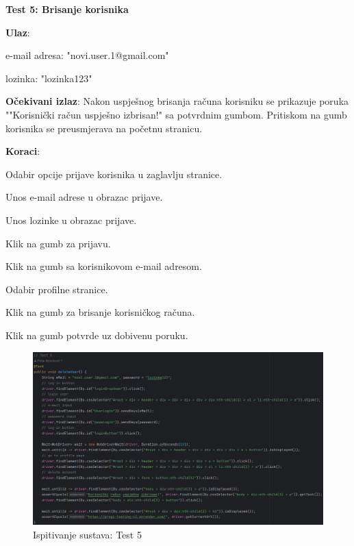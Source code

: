 		 	\textbf{Test 5: Brisanje korisnika}
		 	
		 	\begin{packed_item} 
		 		\item \textbf{Ulaz}:
		 		\begin{packed_item} 
		 			\item e-mail adresa: "novi.user.1@gmail.com"
		 			\item lozinka: "lozinka123"
		 		\end{packed_item}
		 		\item \textbf{Očekivani izlaz}: Nakon uspješnog brisanja računa korisniku se prikazuje poruka ""Korisnički račun uspješno izbrisan!" sa potvrdnim gumbom. Pritiskom na gumb korisnika se preusmjerava na početnu stranicu.
		 		\item \textbf{Koraci}:
		 		\begin{packed_enum} 
		 			\item Odabir opcije prijave korisnika u zaglavlju stranice.
		 			\item Unos e-mail adrese u obrazac prijave.
		 			\item Unos lozinke u obrazac prijave.
		 			\item Klik na gumb za prijavu.
		 			\item Klik na gumb sa korisnikovom e-mail adresom.
		 			\item Odabir profilne stranice. 
		 			\item Klik na gumb za brisanje korisničkog računa.
		 			\item Klik na gumb potvrde uz dobivenu poruku.
		 		\end{packed_enum}
		 	\end{packed_item}
		 	
		 	\begin{figure}[H]
		 		\includegraphics[width=\textwidth]{slike/SeleniumTest5.png} %
		 		\caption{Ispitivanje sustava: Test 5}
		 		\label{fig:SeleniumTest5} %
		 	\end{figure}
		 	
